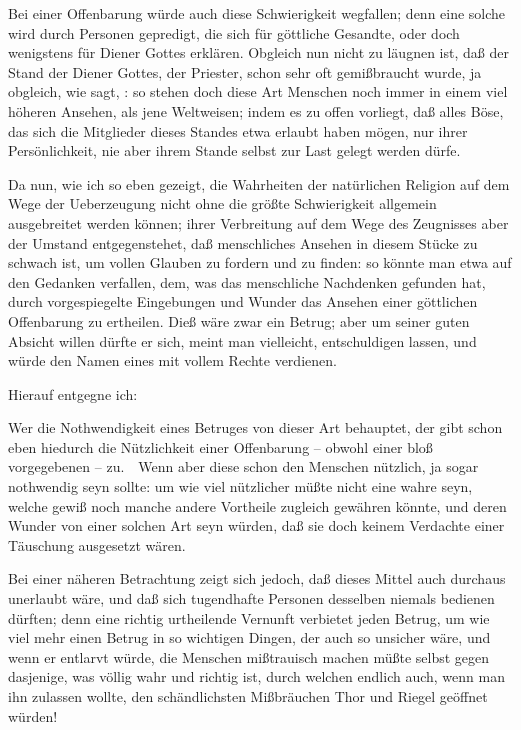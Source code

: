 Bei einer Offenbarung würde auch diese Schwierigkeit wegfallen; denn eine solche wird durch Personen gepredigt, die sich für göttliche Gesandte, oder doch wenigstens für Diener Gottes erklären. Obgleich nun nicht zu läugnen ist, daß der Stand der Diener Gottes, der Priester, schon sehr oft gemißbraucht wurde, ja obgleich, wie  sagt, : so stehen doch diese Art Menschen noch immer in einem viel höheren Ansehen, als jene Weltweisen; indem es zu offen vorliegt, daß alles Böse, das sich die Mitglieder dieses Standes etwa erlaubt haben mögen, nur ihrer Persönlichkeit, nie aber ihrem Stande selbst zur Last gelegt werden dürfe.

Da nun, wie ich so eben gezeigt, die Wahrheiten der natürlichen Religion auf dem Wege der Ueberzeugung nicht ohne die größte Schwierigkeit allgemein ausgebreitet werden können; ihrer Verbreitung auf dem Wege des Zeugnisses aber der Umstand entgegenstehet, daß menschliches Ansehen in diesem Stücke zu schwach ist, um vollen Glauben zu fordern und zu finden: so könnte man etwa auf den Gedanken verfallen, dem, was das menschliche Nachdenken gefunden hat, durch vorgespiegelte Eingebungen und Wunder das Ansehen einer göttlichen Offenbarung zu ertheilen. Dieß wäre zwar ein Betrug; aber um seiner guten Absicht willen dürfte er sich, meint man vielleicht, entschuldigen lassen, und würde den Namen eines  mit vollem Rechte verdienen.\par
Hierauf entgegne ich:
\begin{aufza}
\item Wer die Nothwendigkeit eines Betruges von dieser Art behauptet, der gibt schon eben hiedurch die Nützlichkeit einer Offenbarung -- obwohl einer bloß vorgegebenen -- zu.~\ Wenn aber diese schon den Menschen nützlich, ja sogar nothwendig seyn sollte: um wie viel nützlicher müßte nicht eine wahre seyn, welche gewiß noch manche andere Vortheile zugleich gewähren könnte, und deren Wunder von einer solchen Art seyn würden, daß sie doch keinem Verdachte einer Täuschung ausgesetzt wären.
\item Bei einer näheren Betrachtung zeigt sich jedoch, daß dieses Mittel auch durchaus unerlaubt wäre, und daß sich tugendhafte Personen desselben niemals bedienen dürften; denn eine richtig urtheilende Vernunft verbietet jeden Betrug, um wie viel mehr einen Betrug in so wichtigen Dingen, der auch so unsicher wäre, und wenn er entlarvt würde, die Menschen mißtrauisch machen müßte selbst gegen dasjenige, was völlig wahr und richtig ist, durch welchen endlich auch, wenn man ihn zulassen wollte, den schändlichsten Mißbräuchen Thor und Riegel geöffnet würden!
\end{aufza}
   
